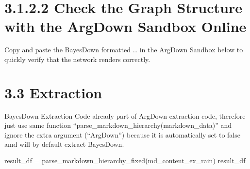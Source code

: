 \documentclass[
  11pt,
  letterpaper,
]{book}
\newenvironment{Shaded}{\begin{snugshade}}{\end{snugshade}}
\newcommand{\NormalTok}[1]{\textcolor[rgb]{0.00,0.23,0.31}{#1}}
\newcommand{\OperatorTok}[1]{\textcolor[rgb]{0.37,0.37,0.37}{#1}}
\begin{document}
\section{3.1.2.2 Check the Graph Structure with the ArgDown Sandbox
Online}\label{check-the-graph-structure-with-the-argdown-sandbox-online-1}

Copy and paste the BayesDown formatted \ldots{} in the ArgDown Sandbox
below to quickly verify that the network renders correctly.

\section{3.3 Extraction}\label{extraction}

BayesDown Extraction Code already part of ArgDown extraction code,
therefore just use same function
``parse\_markdown\_hierarchy(markdown\_data)'' and ignore the extra
argument (``ArgDown'') because it is automatically set to false amd will
by default extract BayesDown.

\begin{Shaded}
\begin{Highlighting}[]
\NormalTok{result\_df }\OperatorTok{=}\NormalTok{ parse\_markdown\_hierarchy\_fixed(md\_content\_ex\_rain)}
\NormalTok{result\_df}
\end{Highlighting}
\end{Shaded}
\end{document}

